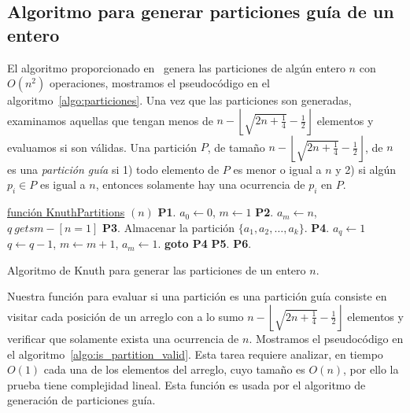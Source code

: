   \subsection{Algoritmo para generar particiones guía de un
  entero}\label{secc:algo_particiones_validas}

    El algoritmo proporcionado en~\cite{Knuth2011} genera las particiones de algún entero
    $n$ con $O(n^2)$ operaciones, mostramos el pseudocódigo en el
    algoritmo~\ref{algo:particiones}. Una vez que las particiones son generadas,
    examinamos aquellas que tengan menos de $n - \left\lfloor\sqrt{2n + \frac{1}{4}} -
    \frac{1}{2}\right\rfloor$ elementos y evaluamos si son válidas. Una partición $P$, de
    tamaño $n -\left\lfloor\sqrt{2n + \frac{1}{4}} - \frac{1}{2}\right\rfloor$, de $n$ es
    una \emph{partición guía} si 1) todo elemento de $P$ es menor o igual a $n$ y 2) si algún $p_i\in P$ es
    igual a $n$, entonces solamente hay una ocurrencia de $p_i$ en $P$.
    \begin{algorithm}[htpb]
      \DontPrintSemicolon
      \underline{función KnuthPartitions} $(n)$\;
      \textbf{P1}. $a_0 \gets 0$, $m\gets 1$\;
      \textbf{P2}. $a_m \gets n$, $q \ gets m - [n=1]$\;
      \textbf{P3}. Almacenar la partición $\{a_1,a_2,\dots,a_k\}$.\;
      \textbf{P4}. $a_q \gets 1$ $q \gets q-1$, $m \gets m+1$, $a_m \gets 1$.\;
      \textbf{goto P4}\;
      \textbf{P5}. 
      \textbf{P6}. 
      \caption{Algoritmo de Knuth para generar las particiones de un entero $n$.}
      \label{algo:particiones}
    \end{algorithm}

    Nuestra función para evaluar si una partición es una partición guía consiste en visitar
    cada posición de un arreglo con a lo sumo $n - \left\lfloor\sqrt{2n + \frac{1}{4}} -
    \frac{1}{2}\right\rfloor$ elementos y verificar que solamente exista una ocurrencia
    de $n$. Mostramos el pseudocódigo en el algoritmo~\ref{algo:is_partition_valid}. Esta tarea
    requiere analizar, en tiempo $O(1)$ cada una de los elementos del arreglo, cuyo tamaño es
    $O(n)$, por ello la prueba tiene complejidad lineal. Esta función es usada por el
    algoritmo de generación de particiones guía.

